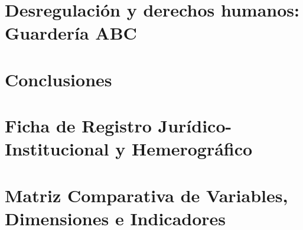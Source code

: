 \documentclass[12pt,letterpaper,oneside,openany]{book}
\begin{document}


\clearpage

\chapter{Desregulación y derechos humanos: Guardería ABC}



\clearpage

\chapter{Conclusiones}



\clearpage


\nocite{*}



\clearpage


\appendix

\chapter{Ficha de Registro Jurídico-Institucional y Hemerográfico}



\clearpage

\chapter{Matriz Comparativa de Variables, Dimensiones e Indicadores}



\clearpage
\end{document}
